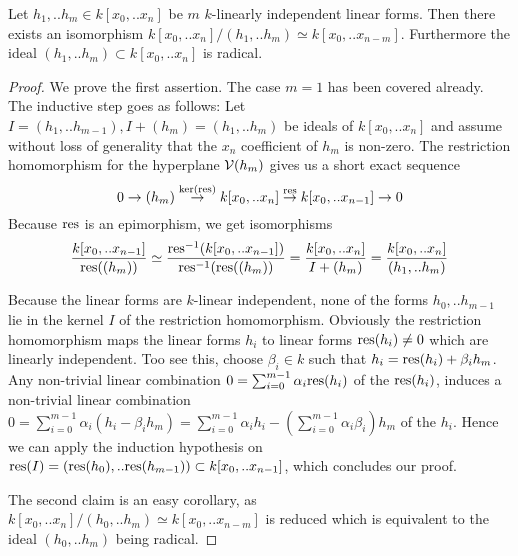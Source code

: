 \begin{corollary} \label{corollaryRadical}
Let $h_1,.. h_m \in k[x_0,..x_n]$ be $m$ $k$-linearly independent linear forms.
Then there exists an isomorphism $k[x_0,..x_n]/(h_1,..h_m) \simeq k[x_0,..x_{n-m}]$.
Furthermore the ideal $(h_1,..h_m)\subset k[x_0,..x_n]$ is radical.
\end{corollary}
\begin{proof}
We prove the first assertion.
The case $m=1$ has been covered already.
The inductive step goes as follows:
Let $I = (h_1,..h_{m-1}), I+(h_m) = (h_1,..h_m)$ be ideals of $k[x_0,..x_n]$ and assume without loss of generality that the $x_n$ coefficient of $h_m$ is non-zero.
The restriction homomorphism for the hyperplane $\operatorname{\mathcal V}(h_m)$ gives us a short exact sequence
\begin{equation}
0 \to (h_m) \overset{\ker({\operatorname{res}})}\to k[x_0,..x_n] \overset{{\operatorname{res}}}\to k[x_0,..x_{n-1}] \to 0
\end{equation}
Because ${\operatorname{res}}$ is an epimorphism, we get isomorphisms
\begin{equation}
\frac{k[x_0,..x_{n-1}]}{{\operatorname{res}}((h_m))}
\simeq \frac{{\operatorname{res}}^{-1}(k[x_0,..x_{n-1}])}{{\operatorname{res}}^{-1}({\operatorname{res}}((h_m))}
= \frac{k[x_0,..x_n]}{I+(h_m)}
= \frac{k[x_0,..x_n]}{(h_1,..h_m)}
\end{equation}

Because the linear forms are $k$-linear independent, none of the forms $h_0,..h_{m-1}$ lie in the kernel $I$ of the restriction homomorphism.
Obviously the restriction homomorphism maps the linear forms $h_i$ to linear forms ${\operatorname{res}}(h_i) \neq 0$ which are linearly independent.
Too see this, choose $\beta_i \in k$ such that $h_i = {\operatorname{res}}(h_i) + \beta_i h_m$.
Any non-trivial linear combination $0 = \sum_{i=0}^{m-1} \alpha_i {\operatorname{res}}(h_i)$ of the ${\operatorname{res}}(h_i)$, induces a non-trivial linear combination $0 = \sum_{i=0}^{m-1} \alpha_i(h_i - \beta_i h_m) = \sum_{i=0}^{m-1}\alpha_i h_i - (\sum_{i=0}^{m-1} \alpha_i\beta_i)h_m$ of the $h_i$.
Hence we can apply the induction hypothesis on ${\operatorname{res}}(I) = ({\operatorname{res}}(h_0),..{\operatorname{res}}(h_{m-1})) \subset k[x_0,..x_{n-1}]$, which concludes our proof.


The second claim is an easy corollary, as $k[x_0,..x_n]/(h_0,..h_m) \simeq k[x_0,..x_{n-m}]$ is reduced which is equivalent to the ideal $(h_0,..h_m)$ being radical.

\end{proof}



